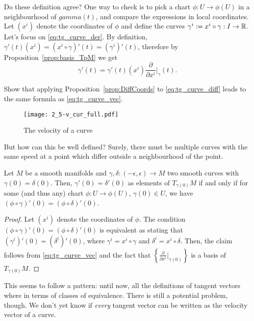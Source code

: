 Do these definition agree?
One way to check is to pick a chart $\phi: U \to \phi(U)$ in a neighbourhood of $gamma(t)$, and compare the expressions in local coordinates. Let $(x^i)$ denote the coordinates of $\phi$ and define the curves $\gamma^i := x^i \circ \gamma : I\to\mathbb{R}$.
Let's focus on \eqref{eq:tg_curve_der}. By definition, $\gamma'(t)(x^i) = (x^i\circ\gamma)'(t) = (\gamma^i)'(t)$, therefore by Proposition~\ref{prop:basis_TpM} we get
\begin{equation}\label{eq:tg_curve_vec}
  \gamma'(t) = %
    \gamma'(t)(x^i) \frac{\partial}{\partial x^i}\Big|_\gamma(t).
\end{equation}
\begin{exercise}
  Show that applying Proposition~\ref{prop:DiffCoords} to \eqref{eq:tg_curve_diff} leads to the same formula as \eqref{eq:tg_curve_vec}.
\end{exercise}

\begin{figure*}[htp]
  \centering
  \texttt{[image: 2\_5-v\_cur\_full.pdf]}
  \caption{The velocity of a curve}
  \label{fig:2_5-v_cur_full}
\end{figure*}

But how can this be well defined? Surely, there must be multiple curves with the same speed at a point which differ outside a neighbourhood of the point.

\begin{lemma}\label{lem:equiv_tg_curves}
  Let $M$ be a smooth manifolds and $\gamma, \delta : (-\epsilon, \epsilon) \to M$ two smooth curves with $\gamma(0) = \delta(0)$. Then, $\gamma'(0) = \delta'(0)$ as elements of $T_{\gamma(0)}M$ if and only if for some (and thus any) chart $\phi:U\to\phi(U)$, $\gamma(0)\in U$, we have $(\phi\circ \gamma)'(0) = (\phi\circ\delta)'(0)$.
\end{lemma}
\begin{proof}
  Let $(x^i)$ denote the coordinates of $\phi$. The condition $(\phi\circ \gamma)'(0) = (\phi\circ\delta)'(0)$ is equivalent as stating that $(\gamma^i)'(0) = (\delta^i)'(0)$, where $\gamma^i = x^i\circ\gamma$ and $\delta^i=x^i\circ\delta$. Then, the claim follows from \eqref{eq:tg_curve_vec} and the fact that $\left\{\frac{\partial}{\partial x^i}\big|_{\gamma(0)}\right\}$ is a basis of $T_{\gamma(0)}M$.
\end{proof}

This seems to follow a pattern: until now, all the definitions of tangent vectors where in terms of classes of equivalence.
There is still a potential problem, though. We don't yet know if \emph{every} tangent vector can be written as the velocity vector of a curve.

